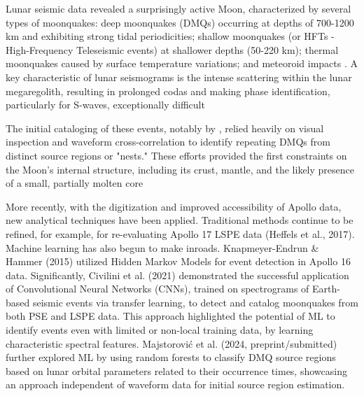 \documentclass[conference]{IEEEtran}
\begin{document}
        Lunar seismic data revealed a surprisingly active Moon, characterized by several types of moonquakes: deep
        moonquakes (DMQs) occurring at depths of 700-1200 km and exhibiting strong tidal periodicities; shallow
        moonquakes (or HFTs - High-Frequency Teleseismic events) at shallower depths (50-220 km); thermal moonquakes
        caused by surface temperature variations; and meteoroid impacts \cite{Nakamura1982, Lognonne2005}
        . A key characteristic of lunar seismograms is the intense scattering within the lunar megaregolith, resulting
        in prolonged codas and making phase identification, particularly for S-waves, exceptionally difficult
        \cite{Dainty1981, Garcia2019}

        The initial cataloging of these events, notably by \cite{Nakamura1982}, relied heavily on visual inspection and
        waveform cross-correlation to identify repeating DMQs from distinct source regions or "nests." These efforts
        provided the first constraints on the Moon's internal structure, including its crust, mantle, and the likely
        presence of a small, partially molten core \cite{Weber2011,Garcia2019}

        More recently, with the digitization and improved accessibility of Apollo data, new analytical techniques have
        been applied. Traditional methods continue to be refined, for example, for re-evaluating Apollo 17 LSPE data
        (Heffels et al., 2017). Machine learning has also begun to make inroads. Knapmeyer-Endrun \& Hammer (2015)
        utilized Hidden Markov Models for event detection in Apollo 16 data. Significantly, Civilini et al. (2021)
        demonstrated the successful application of Convolutional Neural Networks (CNNs), trained on spectrograms of
        Earth-based seismic events via transfer learning, to detect and catalog moonquakes from both PSE and LSPE data.
        This approach highlighted the potential of ML to identify events even with limited or non-local training data,
        by learning characteristic spectral features. Majstorović et al. (2024, preprint/submitted) further explored ML
        by using random forests to classify DMQ source regions based on lunar orbital parameters related to their
        occurrence times, showcasing an approach independent of waveform data for initial source region estimation.
\end{document}
